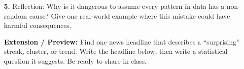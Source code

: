 \documentclass[10pt]{article}
\begin{document}
\begin{practicebox}
\vspace{8pt}
\textbf{5.} Reflection: Why is it dangerous to assume every pattern in data has a
non-random cause? Give one real-world example where this mistake could have harmful
consequences.\\[6pt]

\vspace{8pt}
\textbf{Extension / Preview:} Find one news headline that describes a ``surprising''
streak, cluster, or trend. Write the headline below, then write a statistical question
it suggests. Be ready to share in class.\\[6pt]
\writeline\writeline\writeline
\end{practicebox}
\end{document}
